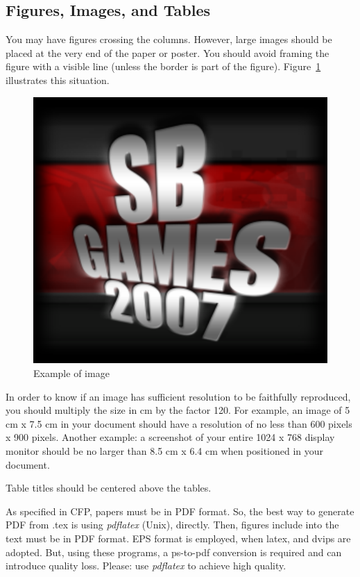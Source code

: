 \documentclass[a4paper]{sbgames}               %
\begin{document}
\subsection{Figures, Images, and Tables}
\label{sec:figur-imag-tabl}

You may have figures crossing the columns. However, large images
should be placed at the very end of the paper or poster. You should
avoid framing the figure with a visible line (unless the border is
part of the figure). Figure~\ref{fig:example} illustrates this situation.  

\begin{figure} 
  \centering 
  \includegraphics[width=0.8\linewidth]{example.pdf}
 \caption{Example of image} 
 \label{fig:example} 
\end{figure}


In order to know if an image has sufficient resolution to be
faithfully reproduced, you should multiply the size in cm by the
factor 120. For example, an image of 5 cm x 7.5 cm in your document
should have a resolution of no less than 600 pixels x 900 pixels.
Another example: a screenshot of your entire 1024 x 768 display
monitor should be no larger than 8.5 cm x 6.4 cm when positioned in
your document.

Table titles should be centered above the tables.

As specified in CFP, papers must be in PDF format. So, the best way to
generate PDF from .tex is using \emph{pdflatex} (Unix), directly.
Then, figures include into the text must be in PDF format. EPS format
is employed, when latex, and dvips are adopted. But, using these
programs, a ps-to-pdf conversion is required and can introduce quality
loss. Please: use \emph{pdflatex} to achieve high quality.
 
\end{document}
